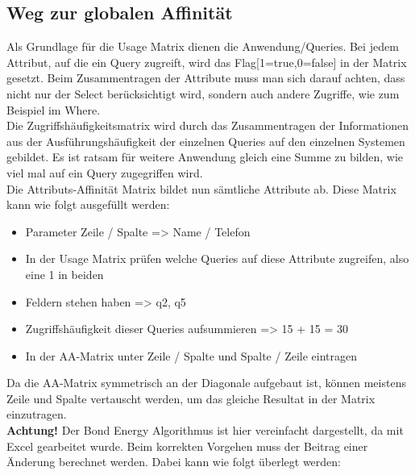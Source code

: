 \documentclass[a4paper,10pt,titlepage=false]{scrreprt}
\begin{document}
\subsection{Weg zur globalen Affinität}
Als Grundlage für die Usage Matrix dienen die Anwendung/Queries. Bei jedem Attribut, auf die ein Query zugreift, wird das Flag[1=true,0=false] in der Matrix gesetzt. Beim Zusammentragen der Attribute muss man sich darauf achten, dass nicht nur der Select berücksichtigt wird, sondern auch andere Zugriffe, wie zum Beispiel im Where.\\
Die Zugriffshäufigkeitsmatrix wird durch das Zusammentragen der Informationen aus der Ausführungshäufigkeit der einzelnen Queries auf den einzelnen Systemen gebildet. Es ist ratsam für weitere Anwendung gleich eine Summe zu bilden, wie viel mal auf ein Query zugegriffen wird.\\
Die Attributs-Affinität Matrix bildet nun sämtliche Attribute ab. Diese Matrix kann wie folgt ausgefüllt werden:
\begin{itemize}
\item Parameter Zeile / Spalte => Name / Telefon
\item In der Usage Matrix prüfen welche Queries auf diese Attribute zugreifen, also eine 1 in beiden \item Feldern stehen haben => q2, q5
\item Zugriffshäufigkeit dieser Queries aufsummieren => 15 + 15 = 30
\item In der AA-Matrix unter Zeile / Spalte und Spalte / Zeile eintragen
\end{itemize}
Da die AA-Matrix symmetrisch an der Diagonale aufgebaut ist, können meistens Zeile und Spalte vertauscht werden, um das gleiche Resultat in der Matrix einzutragen.\\
\textbf{Achtung!} Der Bond Energy Algorithmus ist hier vereinfacht dargestellt, da mit Excel gearbeitet wurde. Beim korrekten Vorgehen muss der Beitrag einer Änderung berechnet werden. Dabei kann wie folgt überlegt werden:
\end{document}
